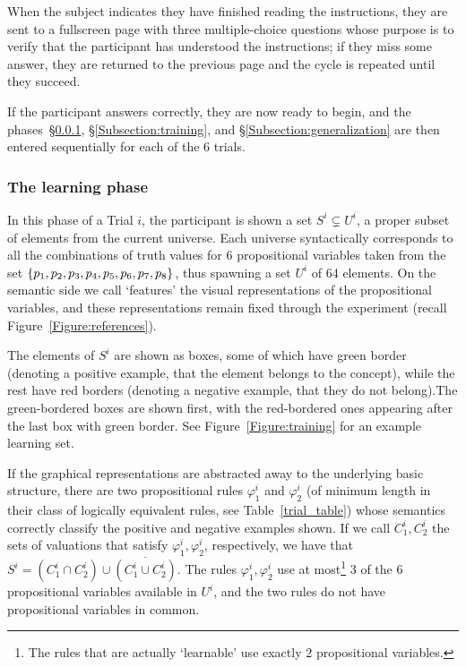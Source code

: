 When the subject indicates they have finished reading the instructions, they are sent to a fullscreen page with three multiple-choice questions whose purpose is to verify that the participant has understood the instructions; if they miss some answer, they are returned to the previous page and the cycle is repeated until they succeed.

If the participant answers correctly, they are now ready to begin, and the phases~\S\ref{Subsection:learning}, \S\ref{Subsection:training}, and \S\ref{Subsection:generalization} are then entered sequentially for each of the 6 trials.

\subsubsection{The learning phase}\label{Subsection:learning}
In this phase of a Trial $i$, the participant is shown a set $S^i \subsetneq U^i$, a proper subset of elements from the current universe. Each universe syntactically corresponds to all the combinations of truth values for 6 propositional variables taken from the set $\{p_1, p_2, p_3, p_4, p_5, p_6, p_7, p_8\}$, thus spawning a set $U^i$ of 64 elements. On the semantic side we call `features' the visual representations of the propositional variables, and these representations remain fixed through the experiment (recall Figure~\ref{Figure:references}).


The elements of $S^i$ are shown as boxes, some of which have green border (denoting a positive example, that the element belongs to the concept), while the rest have red borders (denoting a negative example, that they do not belong).The green-bordered boxes are shown first, with the red-bordered ones appearing after the last box with green border. See Figure~\ref{Figure:training} for an example learning set. 


If the graphical representations are abstracted away to the underlying basic structure, there are two propositional rules $\varphi^i_1$ and $\varphi^i_2$ (of minimum length in their class of logically equivalent rules, see Table~\ref{trial_table}) whose semantics correctly classify the positive and negative examples shown. If we call $C^i_1, C^i_2$ the sets of valuations that satisfy $\varphi^i_1, \varphi^i_2$, respectively, we have that $S^i = (C^i_1 \cap C^i_2) \cup \overline{(C^i_1 \cup C^i_2)}$. The rules $\varphi^i_1, \varphi^i_2$ use at most\footnote{The rules that are actually `learnable' use exactly 2 propositional variables.} 3 of the 6 propositional variables available in $U^i$, and the two rules do not have propositional variables in common. 

